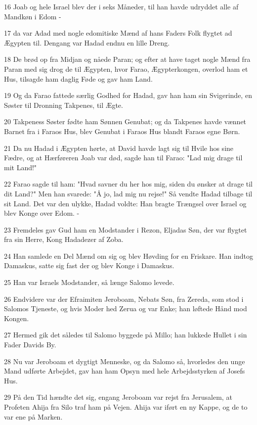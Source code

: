\par 16 Joab og hele Israel blev der i seks Måneder, til han havde udryddet alle af Mandkøn i Edom -
\par 17 da var Adad med nogle edomitiske Mænd af hans Faders Folk flygtet ad Ægypten til. Dengang var Hadad endnu en lille Dreng.
\par 18 De brød op fra Midjan og nåede Paran; og efter at have taget nogle Mænd fra Paran med sig drog de til Ægypten, hvor Farao, Ægypterkongen, overlod ham et Hus, tilsagde ham daglig Føde og gav ham Land.
\par 19 Og da Farao fattede særlig Godhed for Hadad, gav han ham sin Svigerinde, en Søster til Dronning Takpenes, til Ægte.
\par 20 Takpeness Søster fødte ham Sønnen Genubat; og da Takpenes havde vænnet Barnet fra i Faraos Hus, blev Genubat i Faraos Hus blandt Faraos egne Børn.
\par 21 Da nu Hadad i Ægypten hørte, at David havde lagt sig til Hvile hos sine Fædre, og at Hærføreren Joab var død, sagde han til Farao: "Lad mig drage til mit Land!"
\par 22 Farao sagde til ham: "Hvad savner du her hos mig, siden du ønsker at drage til dit Land?" Men han svarede: "Å jo, lad mig nu rejse!" Så vendte Hadad tilbage til sit Land. Det var den ulykke, Hadad voldte: Han bragte Trængsel over Israel og blev Konge over Edom. -
\par 23 Fremdeles gav Gud ham en Modstander i Rezon, Eljadas Søn, der var flygtet fra sin Herre, Kong Hadadezer af Zoba.
\par 24 Han samlede en Del Mænd om sig og blev Høvding for en Friskare. Han indtog Damaskus, satte sig fast der og blev Konge i Damaskus.
\par 25 Han var Israels Modstander, så længe Salomo levede.
\par 26 Endvidere var der Efraimiten Jeroboam, Nebats Søn, fra Zereda, som stod i Salomos Tjeneste, og hvis Moder hed Zerua og var Enke; han løftede Hånd mod Kongen.
\par 27 Hermed gik det således til Salomo byggede på Millo; han lukkede Hullet i sin Fader Davids By.
\par 28 Nu var Jeroboam et dygtigt Menneske, og da Salomo så, hvorledes den unge Mand udførte Arbejdet, gav han ham Opsyn med hele Arbejdsstyrken af Josefs Hus.
\par 29 På den Tid hændte det sig, engang Jeroboam var rejst fra Jerusalem, at Profeten Ahija fra Silo traf ham på Vejen. Ahija var iført en ny Kappe, og de to var ene på Marken.
